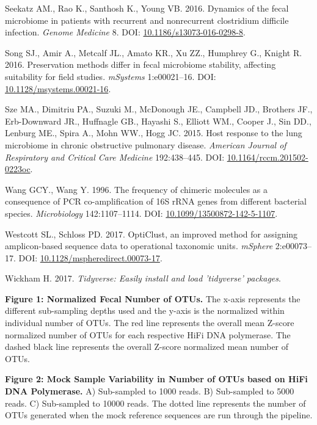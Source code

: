 \documentclass[12pt,]{article}
\begin{document}
\hypertarget{ref-erin_seekatz_2016}{}
Seekatz AM., Rao K., Santhosh K., Young VB. 2016. Dynamics of the fecal
microbiome in patients with recurrent and nonrecurrent clostridium
difficile infection. \emph{Genome Medicine} 8. DOI:
\href{https://doi.org/10.1186/s13073-016-0298-8}{10.1186/s13073-016-0298-8}.

\hypertarget{ref-preservation_Song_2016}{}
Song SJ., Amir A., Metcalf JL., Amato KR., Xu ZZ., Humphrey G., Knight
R. 2016. Preservation methods differ in fecal microbiome stability,
affecting suitability for field studies. \emph{mSystems} 1:e00021--16.
DOI:
\href{https://doi.org/10.1128/msystems.00021-16}{10.1128/msystems.00021-16}.

\hypertarget{ref-Sze2015}{}
Sze MA., Dimitriu PA., Suzuki M., McDonough JE., Campbell JD., Brothers
JF., Erb-Downward JR., Huffnagle GB., Hayashi S., Elliott WM., Cooper
J., Sin DD., Lenburg ME., Spira A., Mohn WW., Hogg JC. 2015. Host
response to the lung microbiome in chronic obstructive pulmonary
disease. \emph{American Journal of Respiratory and Critical Care
Medicine} 192:438--445. DOI:
\href{https://doi.org/10.1164/rccm.201502-0223oc}{10.1164/rccm.201502-0223oc}.

\hypertarget{ref-Wang1996}{}
Wang GCY., Wang Y. 1996. The frequency of chimeric molecules as a
consequence of PCR co-amplification of 16S rRNA genes from different
bacterial species. \emph{Microbiology} 142:1107--1114. DOI:
\href{https://doi.org/10.1099/13500872-142-5-1107}{10.1099/13500872-142-5-1107}.

\hypertarget{ref-opticlust_Westcott_2017}{}
Westcott SL., Schloss PD. 2017. OptiClust, an improved method for
assigning amplicon-based sequence data to operational taxonomic units.
\emph{mSphere} 2:e00073--17. DOI:
\href{https://doi.org/10.1128/mspheredirect.00073-17}{10.1128/mspheredirect.00073-17}.

\hypertarget{ref-tidyverse_2017}{}
Wickham H. 2017. \emph{Tidyverse: Easily install and load 'tidyverse'
packages}.

\newpage

\textbf{Figure 1: Normalized Fecal Number of OTUs.} The x-axis
represents the different sub-sampling depths used and the y-axis is the
normalized within individual number of OTUs. The red line represents the
overall mean Z-score normalized number of OTUs for each respective HiFi
DNA polymerase. The dashed black line represents the overall Z-score
normalized mean number of OTUs.

\textbf{Figure 2: Mock Sample Variability in Number of OTUs based on
HiFi DNA Polymerase.} A) Sub-sampled to 1000 reads. B) Sub-sampled to
5000 reads. C) Sub-sampled to 10000 reads. The dotted line represents
the number of OTUs generated when the mock reference sequences are run
through the pipeline.
\end{document}
